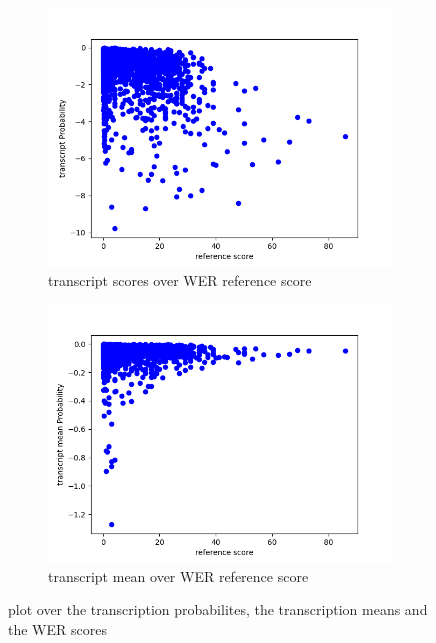\begin{figure}[h]
    \centering%
    \begin{subfigure}{0.45\linewidth}
        \includegraphics[width=\textwidth]{Latex/sections/images/transcriptbasescore.png}
        \caption{transcript scores over WER reference score}
        \label{fig:transcript scatter plot base}
    \end{subfigure}
    \begin{subfigure}{0.45\linewidth}
        \includegraphics[width=\textwidth]{Latex/sections/images/transcriptmeanbasescore.png}
        \caption{transcript mean over WER reference score}
        \label{fig:transcript mean scatter plot}
    \end{subfigure}
    \caption{plot over the transcription probabilites, the transcription means and the WER scores}
    \label{fig:transcript scatter plot}
\end{figure}


